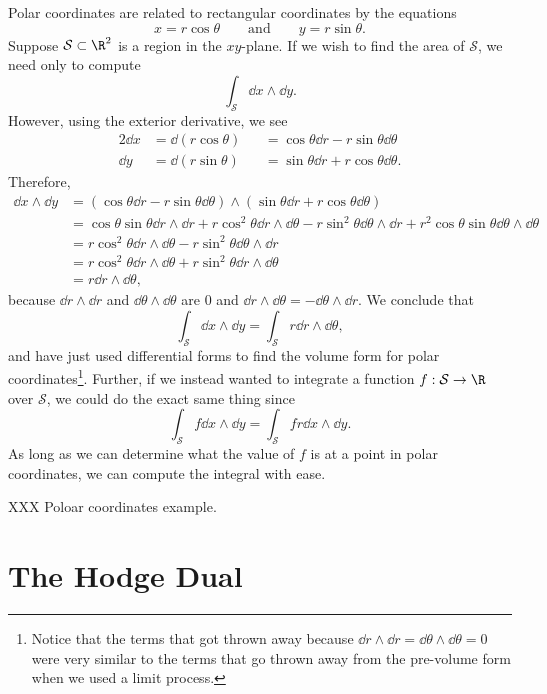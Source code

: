 Polar coordinates are related to rectangular coordinates by the equations
\[
	x=r\cos\theta \qquad\text{and}\qquad y=r\sin\theta.
\]
Suppose $\mathcal S\subset \R^2$ is a region in the $xy$-plane.  If we wish to find
the area of $\mathcal S$, we need only to compute
\[
	\int_{\mathcal S} \dd x\wedge \dd y.
\]
However, using the exterior derivative, we see
\begin{alignat*}{2}
	\dd x &= \dd (r\cos\theta) &&= \cos\theta \dd r - r\sin\theta \dd \theta\\
	\dd y &= \dd (r\sin\theta) &&= \sin\theta \dd r + r\cos\theta \dd \theta.
\end{alignat*}
Therefore, 
\begin{align*}
	\dd x\wedge \dd y &= (\cos\theta \dd r - r\sin\theta \dd \theta)\wedge 
		(\sin\theta \dd r + r\cos\theta \dd \theta)\\
	&= \cos\theta\sin\theta \dd r\wedge \dd r + r\cos^2\theta \dd r\wedge \dd \theta
	-r\sin^2\theta \dd \theta \wedge \dd r + r^2\cos\theta\sin\theta \dd \theta\wedge \dd \theta\\
	&=r\cos^2\theta \dd r\wedge \dd \theta-r\sin^2\theta \dd \theta \wedge \dd r\\
	&= r\cos^2\theta \dd r\wedge \dd \theta + r\sin^2\theta \dd r \wedge \dd \theta\\
	&= r\dd r\wedge \dd \theta,
\end{align*}
because $\dd r\wedge \dd r$ and $\dd\theta\wedge \dd\theta$ are 0 and $\dd r\wedge 
\dd\theta = -\dd \theta \wedge \dd r$.  We conclude that
\[
	\int_{\mathcal S} \dd x\wedge \dd y = \int_{\mathcal S} r\dd r\wedge \dd \theta,
\]
and have just used differential forms to find the volume form for polar 
coordinates\footnote{
Notice that the terms that got thrown away because $\dd r\wedge \dd r=\dd\theta\wedge \dd\theta=0$
were very similar to the terms that go thrown away from the pre-volume form when
we used a limit process.
}.  Further, if we instead wanted to integrate a function $f:\mathcal S\to \R$
over $\mathcal S$, 
we could do the exact same thing since
\[
	\int_{\mathcal S} f\dd x\wedge \dd y = \int_{\mathcal S} fr\dd x\wedge \dd y.
\]
As long as we can determine what the value of $f$ is at a point in polar coordinates, 
we can compute the integral with ease.

\begin{example}
	XXX Poloar coordinates example.
\end{example}

\section{The Hodge Dual}

